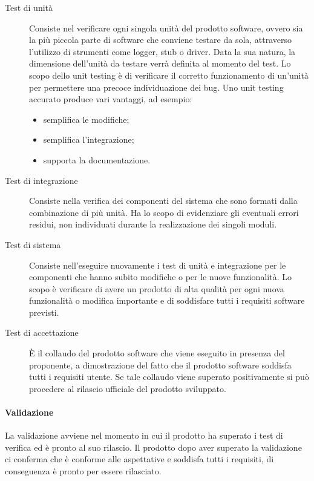 \documentclass[../PianoDiQualifica.tex]{subfiles}
\begin{document}
					\begin{description}
						\item [Test di unità] Consiste nel verificare ogni singola unità del prodotto software, ovvero sia la più piccola parte di software che conviene testare da sola, attraverso l'utilizzo di strumenti come logger, stub o driver. Data la sua natura, la dimensione dell'unità da testare verrà definita al momento del test. Lo scopo dello unit testing è di verificare il corretto funzionamento di un'unità per permettere una precoce individuazione dei bug. Uno unit testing accurato produce vari vantaggi, ad esempio:
						\begin{itemize}
							\item semplifica le modifiche;
							\item semplifica l'integrazione;
							\item supporta la documentazione.
						\end{itemize}
						\item[Test di integrazione] Consiste nella verifica dei componenti del sistema che sono formati dalla combinazione di più unità. Ha lo scopo di evidenziare gli eventuali errori residui, non individuati durante la realizzazione dei singoli moduli.
						\item[Test di sistema] Consiste nell'eseguire nuovamente i test di unità e integrazione per le componenti che hanno subito modifiche o per le nuove funzionalità. Lo scopo è verificare di avere un prodotto di alta qualità per ogni nuova funzionalità o modifica importante e di soddisfare tutti i requisiti software previsti.
						\item[Test di accettazione] È il collaudo del prodotto software che viene eseguito in presenza del proponente, a dimostrazione del fatto che il prodotto software soddisfa tutti i requisiti utente. Se tale collaudo viene superato positivamente si può procedere al rilascio ufficiale del prodotto sviluppato. 
					\end{description}
				\paragraph{Validazione}
				La validazione avviene nel momento in cui il prodotto ha superato i test di verifica ed è pronto al suo rilascio. Il prodotto dopo aver superato la validazione ci conferma che è conforme alle aspettative e soddisfa tutti i requisiti, di conseguenza è pronto per essere rilasciato.
\end{document}
